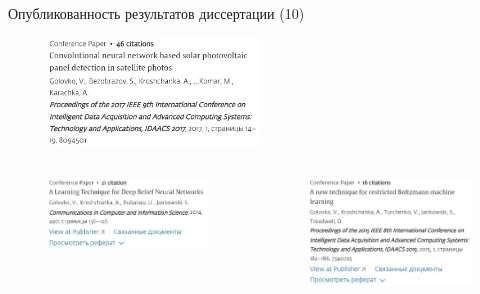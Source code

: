 \documentclass[10pt]{beamer}
\begin{document}
        \begin{frame}{Опубликованность результатов диссертации (10)}
            \begin{figure}
                \centering
                \includegraphics[width=0.5\textwidth]{pub_1.jpg}
            \end{figure}
            \begin{columns}
                \begin{column}{0.45\textwidth}
                    \begin{figure}
                        \centering
                        \includegraphics[width=1.1\textwidth]{pub_2.jpg}
                    \end{figure}
                \end{column}
                \begin{column}{0.45\textwidth}
                    \begin{figure}
                        \centering
                        \includegraphics[width=1.1\textwidth]{pub_3.jpg}
                    \end{figure}
                \end{column}
            \end{columns}
        \end{frame}
\end{document}
